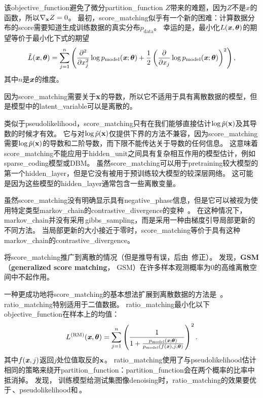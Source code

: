 该\gls{objective_function}避免了微分\gls{partition_function} $Z$带来的难题，因为$Z$不是$x$的函数，所以$\nabla_{\mathbf{x}} Z = 0$。
最初，\gls{score_matching}似乎有一个新的困难：计算数据分布的\gls{score}需要知道生成训练数据的真实分布$p_{\text{data}}$。
幸运的是，最小化$L(\boldsymbol{\mathit{x}}, \boldsymbol{\theta})$的期望等价于最小化下式的期望
\begin{equation}
	\tilde{L} (\boldsymbol{\mathit{x}}, \boldsymbol{\theta}) = \sum_{j=1}^n \left( \frac{\partial^2}{ \partial x_j^2 } 
	\log p_{\text{model}} (\boldsymbol{\mathit{x}}; \boldsymbol{\theta}) + \frac{1}{2} \left( \frac{\partial}{ \partial x_j }
	\log p_{\text{model}} (\boldsymbol{\mathit{x}}; \boldsymbol{\theta})
  \right)^2
\right),
\end{equation}
其中$n$是$\boldsymbol{\mathit{x}}$的维度。


因为\gls{score_matching}需要关于$\mathbf{x}$的导数，所以它不适用于具有离散数据的模型，但是模型中的\gls{latent_variable}可以是离散的。


类似于\gls{pseudolikelihood}，\gls{score_matching}只有在我们能够直接估计$\log \tilde{p}(\mathbf{x})$及其导数的时候才有效。
它与对$\log \tilde{p}(\mathbf{x})$仅提供下界的方法不兼容，因为\gls{score_matching}需要$\log \tilde{p}(\mathbf{x})$的导数和二阶导数，而下限不能传达关于导数的任何信息。
这意味着\gls{score_matching}不能应用于\gls{hidden_unit}之间具有复杂相互作用的模型估计，例如\gls{sparse_coding}模型或\gls{DBM}。
虽然\gls{score_matching}可以用于\gls{pretraining}较大模型的第一个\gls{hidden_layer}，但是它没有被用于预训练较大模型的较深层网络。
这可能是因为这些模型的\gls{hidden_layer}通常包含一些离散变量。


虽然\gls{score_matching}没有明确显示具有\gls{negative_phase}信息，但是它可以被视为使用特定类型\gls{markov_chain}的\gls{contrastive_divergence}的变种~\citep{Hyvarinen-2007b}。
在这种情况下，\gls{markov_chain}并没有采用\,\gls{gibbs_sampling}，而是采用一种由梯度引导局部更新的不同方法。
当局部更新的大小接近于零时，\gls{score_matching}等价于具有这种\gls{markov_chain}的\gls{contrastive_divergence}。

\cite{Lyu09}将\gls{score_matching}推广到离散的情况（但是推导有误，后由~\cite{Marlin10Inductive-small}修正）。
\cite{Marlin10Inductive-small}发现，\textbf{\gls{GSM}}（\textbf{generalized score matching}， GSM）在许多样本观测概率为$0$的高维离散空间中不起作用。


一种更成功地将\gls{score_matching}的基本想法扩展到离散数据的方法是~\citep{Hyvarinen-2007}。
\gls{ratio_matching}特别适用于二值数据。
\gls{ratio_matching}最小化以下\gls{objective_function}在样本上的均值：
\begin{equation}
	L^{(\text{RM})} (\boldsymbol{\mathit{x}}, \boldsymbol{\theta}) = \sum_{j=1}^n \left( 
	\frac{1}{ 1 + \frac{ p_{\text{model}}(\boldsymbol{\mathit{x}}; \boldsymbol{\theta}) }{ p_{\text{model}}(f(\boldsymbol{\mathit{x}}), j; \boldsymbol{\theta}) } } 
\right)^2.
\end{equation}
其中$f(\boldsymbol{\mathit{x}}, j)$返回$j$处位值取反的$\mathbf{x}$。
\gls{ratio_matching}使用了与\gls{pseudolikelihood}估计相同的策略来绕开\gls{partition_function}：\gls{partition_function}会在两个概率的比率中抵消掉。
\cite{Marlin10Inductive-small}发现，
训练模型给测试集图像\gls{denoising}时，\gls{ratio_matching}的效果要优于\,、\gls{pseudolikelihood}和\,。


